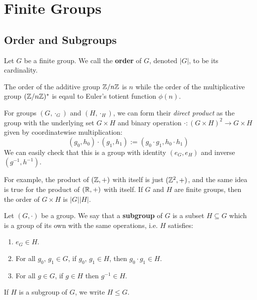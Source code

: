 \section{Finite Groups}


\subsection{Order and Subgroups}

\begin{defbox}
   Let $G$ be a finite group. We call the \textbf{order} of $G$, denoted $|G|$, to be its cardinality.
\end{defbox}

\begin{example}
   The order of the additive group $\mathbb{Z} / n\mathbb{Z}$ is $n$ while the order of the multiplicative group $(\mathbb{Z} / n\mathbb{Z})^*$ is eqaul to Euler's totient function $\phi(n)$.
\end{example}

\begin{example}
   For groups $(G, \cdot_G)$ and $(H, \cdot_H)$, we can form their \textit{direct product} as the group with the underlying set $G \times H$ and binary operation $\cdot \colon (G \times H)^2 \to G \times H$ given by coordinatewise multiplication: 
   \[ (g_0, h_0) \cdot (g_1, h_1) := (g_0 \cdot g_1, h_0 \cdot h_1) \]
We can easily check that this is a group with identity $(e_G, e_H)$ and inverse $(g^{-1}, h^{-1})$. 

For example, the product of $(\mathbb{Z}, +)$ with itself is just $(\mathbb{Z}^2, +)$, and the same idea is true for the product of $(\mathbb{R}, +)$ with itself. If $G$ and $H$ are finite groups, then the order of $G \times H$ is $|G||H|$. 
\end{example}

\begin{defbox}
   Let $(G, \cdot)$ be a group. We say that a \textbf{subgroup} of $G$ is a subset $H \subseteq G$ which is a group of its own with the same operations, i.e. $H$ satisfies:
   \begin{enumerate}
      \item $e_G \in H$. 
      \item For all $g_0$, $g_1 \in G$, if $g_0$, $g_1 \in H$, then $g_0 \cdot g_1 \in H$.
      \item For all $g \in G$, if $g \in H$ then $g^{-1} \in H$. 
   \end{enumerate}
   If $H$ is a subgroup of $G$, we write $H \leq G$. 
\end{defbox}

